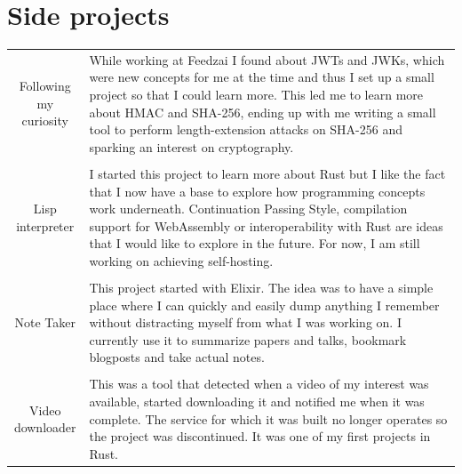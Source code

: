 \documentclass[a4paper,10pt]{article}
\begin{document}
\section{Side projects}
\begin{tabular}{c|p{11cm}}
    \parbox[t]{3cm}{\medskip Following my \\ curiosity} &
\small{While working at Feedzai I found about JWTs and JWKs, which were new concepts for me at the time and thus I set up a small project so that I could learn more. This led me to learn more about HMAC and SHA-256, ending up with me writing a small tool to perform length-extension attacks on SHA-256 and sparking an interest on cryptography.} \\

     \\
    \parbox[t]{3cm}{\medskip Lisp \\ interpreter} &
\small{I started this project to learn more about Rust but I like the fact that I now have a base to explore how programming concepts work underneath. Continuation Passing Style, compilation support for WebAssembly or interoperability with Rust are ideas that I would like to explore in the future. For now, I am still working on achieving self-hosting.} \\

     \\

    \parbox[t]{3cm}{\bigskip Note Taker} &
    \small{This project started with Elixir. The idea was to have a simple place where I can quickly and easily dump anything I remember without distracting myself from what I was working on. I currently use it to summarize papers and talks, bookmark blogposts and take actual notes.} \\

     \\

    \parbox[t]{3cm}{\smallskip Video \\ downloader} &
    \small{This was a tool that detected when a video of my interest was available, started downloading it and notified me when it was complete. The service for which it was built no longer operates so the project was discontinued. It was one of my first projects in Rust.} \\

\end{tabular}
\end{document}
